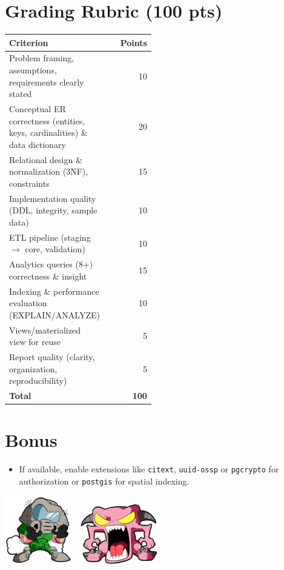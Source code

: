\documentclass[11pt]{article}
\begin{document}
\section{Grading Rubric (100 pts)}
\begin{center}
\begin{tabular}{p{0.48\linewidth}r}
\toprule
\textbf{Criterion} & \textbf{Points} \\
\midrule
Problem framing, assumptions, requirements clearly stated & 10 \\
Conceptual ER correctness (entities, keys, cardinalities) \& data dictionary & 20 \\
Relational design \& normalization (3NF), constraints & 15 \\
Implementation quality (DDL, integrity, sample data) & 10 \\
ETL pipeline (staging $\rightarrow$ core, validation) & 10 \\
Analytics queries (8+) correctness \& insight & 15 \\
Indexing \& performance evaluation (EXPLAIN/ANALYZE) & 10 \\
Views/materialized view for reuse & 5 \\
Report quality (clarity, organization, reproducibility) & 5 \\
\midrule
\textbf{Total} & \textbf{100} \\
\bottomrule
\end{tabular}
\end{center}

\section{Bonus}
\begin{itemize}[leftmargin=*]
  \item If available, enable extensions like \texttt{citext}, \texttt{uuid-ossp} or \texttt{pgcrypto} for authorization or \texttt{postgis} for spatial indexing.
\end{itemize}

\vspace{1cm}
\centering
\includegraphics[width=3cm]{figures/doomguy1}
\hspace{5mm}
\includegraphics[width=3.6cm]{figures/demon}
\end{document}

